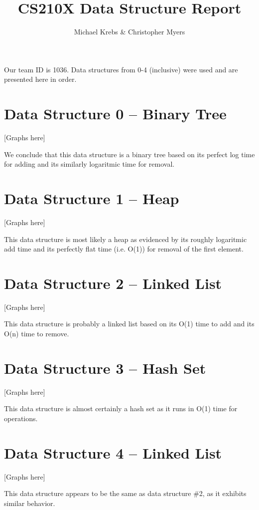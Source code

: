 \documentclass{article}
\title{CS210X Data Structure Report}
\author{Michael Krebs \& Christopher Myers}
\begin{document}
	\maketitle

	Our team ID is 1036. Data structures from 0-4 (inclusive) were used
	and are presented here in order.

	\section{Data Structure 0 -- Binary Tree}

	[Graphs here]

	We conclude that this data structure is a binary tree based on its
	perfect log time for adding and its similarly logaritmic time for
	removal.
	\section{Data Structure 1 -- Heap}

	[Graphs here]

	This data structure is most likely a heap as evidenced by its roughly
	logaritmic add time and its perfectly flat time (i.e. O(1)) for removal
	of the first element.

	\section{Data Structure 2 -- Linked List}

	[Graphs here]

	This data structure is probably a linked list based on its O(1) time to
	add and its O(n) time to remove.

	\section{Data Structure 3 -- Hash Set}

	[Graphs here]

	This data structure is almost certainly a hash set as it runs in O(1)
	time for operations.

	\section{Data Structure 4 -- Linked List}
	
	[Graphs here]

	This data structure appears to be the same as data structure \#2, as it
	exhibits similar behavior.
\end{document}

